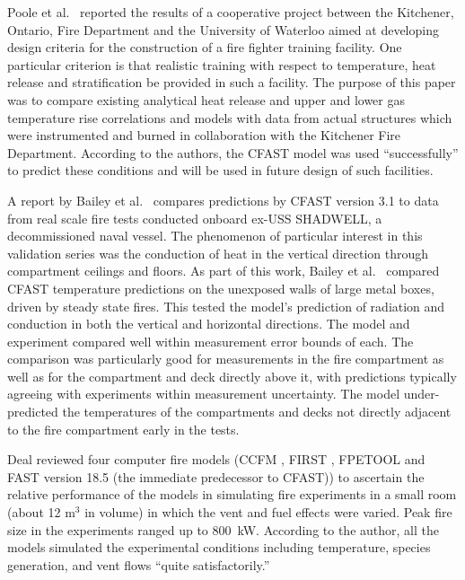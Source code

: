 Poole et al.~\cite{Valid:Poole} reported the results of a cooperative project between the Kitchener, Ontario, Fire Department and the University of Waterloo aimed at developing design criteria for the construction of a fire fighter training facility. One particular criterion is that realistic training with respect to temperature, heat release and stratification be provided in such a facility. The purpose of this paper was to compare existing analytical heat release and upper and lower gas temperature rise correlations and models with data from actual structures which were instrumented and burned in collaboration with the Kitchener Fire Department. According to the authors, the CFAST model was used ``successfully'' to predict these conditions and will be used in future design of such facilities.

A report by Bailey et al.~\cite{Valid:Bailey_Shadwell} compares predictions by CFAST version 3.1 to data from real scale fire tests conducted onboard ex-USS SHADWELL, a decommissioned naval vessel. The phenomenon of particular interest in this validation series was the conduction of heat in the vertical direction through compartment ceilings and floors. As part of this work, Bailey et al.~\cite{Valid:Bailey_Vertical_Heat} compared CFAST temperature predictions on the unexposed walls of large metal boxes, driven by steady state fires. This tested the model's prediction of radiation and conduction in both the vertical and horizontal directions. The model and experiment compared well within measurement error bounds of each. The comparison was particularly good for measurements in the fire compartment as well as for the compartment and deck directly above it, with predictions typically agreeing with experiments within measurement uncertainty. The model under-predicted the temperatures of the compartments and decks not directly adjacent to the fire compartment early in the tests.

Deal \cite{Valid:Deal} reviewed four computer fire models (CCFM \cite{Models:CCFM}, FIRST \cite{Models:FIRST}, FPETOOL \cite{Models:FPETool} and FAST \cite{Models:FAST} version 18.5 (the immediate predecessor to CFAST)) to ascertain the relative performance of the models in simulating fire experiments in a small room (about 12 m$^3$ in volume) in which the vent and fuel effects were varied. Peak fire size in the experiments ranged up to 800~kW. According to the author, all the models simulated the experimental conditions including temperature, species generation, and vent flows ``quite satisfactorily.''

